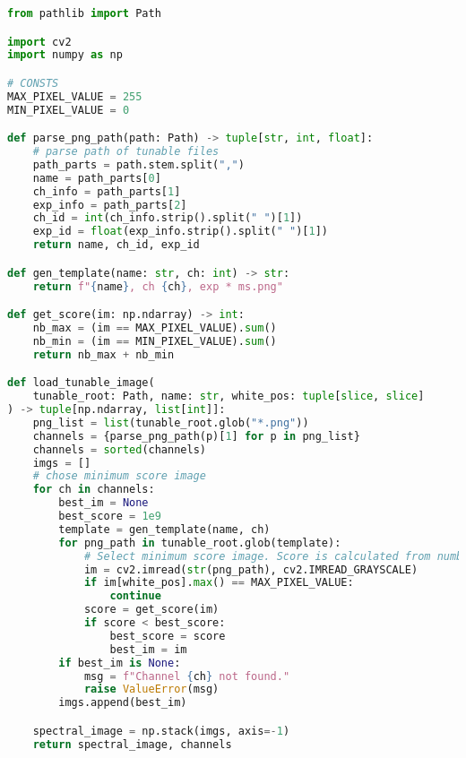 \begin{lstlisting}[language=python, caption=Load Tunable Light Sources images, label={code:load-tunable}]
from pathlib import Path

import cv2
import numpy as np

# CONSTS
MAX_PIXEL_VALUE = 255
MIN_PIXEL_VALUE = 0

def parse_png_path(path: Path) -> tuple[str, int, float]:
    # parse path of tunable files
    path_parts = path.stem.split(",")
    name = path_parts[0]
    ch_info = path_parts[1]
    exp_info = path_parts[2]
    ch_id = int(ch_info.strip().split(" ")[1])
    exp_id = float(exp_info.strip().split(" ")[1])
    return name, ch_id, exp_id

def gen_template(name: str, ch: int) -> str:
    return f"{name}, ch {ch}, exp * ms.png"

def get_score(im: np.ndarray) -> int:
    nb_max = (im == MAX_PIXEL_VALUE).sum()
    nb_min = (im == MIN_PIXEL_VALUE).sum()
    return nb_max + nb_min

def load_tunable_image(
    tunable_root: Path, name: str, white_pos: tuple[slice, slice]
) -> tuple[np.ndarray, list[int]]:
    png_list = list(tunable_root.glob("*.png"))
    channels = {parse_png_path(p)[1] for p in png_list}
    channels = sorted(channels)
    imgs = []
    # chose minimum score image
    for ch in channels:
        best_im = None
        best_score = 1e9
        template = gen_template(name, ch)
        for png_path in tunable_root.glob(template):
            # Select minimum score image. Score is calculated from number of unvalid pixels
            im = cv2.imread(str(png_path), cv2.IMREAD_GRAYSCALE)
            if im[white_pos].max() == MAX_PIXEL_VALUE:
                continue
            score = get_score(im)
            if score < best_score:
                best_score = score
                best_im = im
        if best_im is None:
            msg = f"Channel {ch} not found."
            raise ValueError(msg)
        imgs.append(best_im)

    spectral_image = np.stack(imgs, axis=-1)
    return spectral_image, channels

\end{lstlisting}